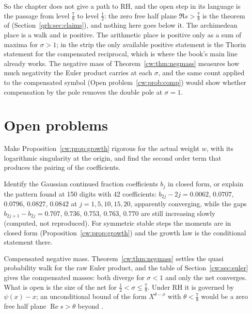 So the chapter does not give a path to RH, and the open step in its language is the passage from level $\frac78$ to level $\frac12$: the zero free half plane $\Re s>\frac78$ is the theorem of \cite{OAI26a} (Section~\ref{qrh:sec:claims}), and nothing here goes below it. The archimedean place is a walk and is positive. The arithmetic place is positive only as a sum of maxima for $\sigma>1$; in the strip the only available positive statement is the Thorin statement for the compensated reciprocal, which is where the book's main line already works. The negative mass of Theorem~\ref{cw:thm:negmass} measures how much negativity the Euler product carries at each $\sigma$, and the same count applied to the compensated symbol (Open problem~\ref{cw:prob:comp}) would show whether compensation by the pole removes the double pole at $\sigma=1$.

\section{Open problems}\label{cw:sec:open}

\begin{problem}\label{cw:prob:growth}
Make Proposition~\ref{cw:prop:growth} rigorous for the actual weight $w$, with its logarithmic singularity at the origin, and find the second order term that produces the pairing of the coefficients.
\end{problem}

\begin{problem}
Identify the Gaussian continued fraction coefficients $b_j$ in closed form, or explain the pattern found at 150 digits with 42 coefficients: $b_{2j}-2j=0.0062$, $0.0707$, $0.0796$, $0.0827$, $0.0842$ at $j=1,5,10,15,20$, apparently converging, while the gaps $b_{2j+1}-b_{2j}=0.707$, $0.736$, $0.753$, $0.763$, $0.770$ are still increasing slowly (computed, not reproduced). For symmetric stable steps the moments are in closed form (Proposition~\ref{cw:prop:growth}) and the growth law is the conditional statement there.
\end{problem}

\begin{problem}\label{cw:prob:comp}
Compensated negative mass. Theorem~\ref{cw:thm:negmass} settles the quasi probability walk for the raw Euler product, and the table of Section~\ref{cw:sec:euler} gives the compensated masses: both diverge for $\sigma<1$ and only the net converges. What is open is the size of the net for $\frac12<\sigma\le\frac78$. Under RH it is governed by $\psi(x)-x$; an unconditional bound of the form $X^{\theta-\sigma}$ with $\theta<\frac78$ would be a zero free half plane $\operatorname{Re}s>\theta$ beyond \cite{OAI26a}.
\end{problem}

